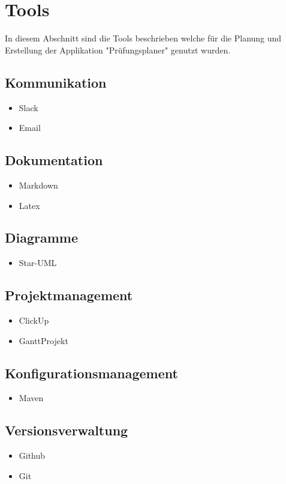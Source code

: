 \section{Tools}

In diesem Abschnitt sind die Tools beschrieben welche für die Planung und Erstellung der Applikation "Prüfungsplaner" genutzt wurden.

\subsection{Kommunikation} 
\begin{itemize}
	\item Slack
	\item Email
\end{itemize}
 
\subsection{Dokumentation}
\begin{itemize}
	\item Markdown
	\item Latex
\end{itemize} 

\subsection{Diagramme} 
\begin{itemize}
	\item Star-UML
\end{itemize}

\subsection{Projektmanagement}
\begin{itemize}
	\item ClickUp
	\item GanttProjekt
\end{itemize} 

\subsection{Konfigurationsmanagement} 
\begin{itemize}
	\item Maven
\end{itemize} 
  
\subsection{Versionsverwaltung}
\begin{itemize}
	\item Github
	\item Git
\end{itemize}

